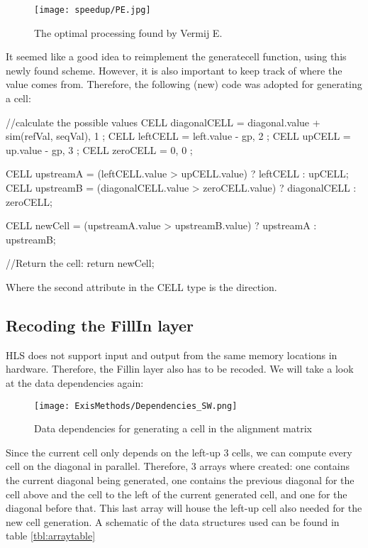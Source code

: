 \begin{figure}[H]
	\centering
	\texttt{[image: speedup/PE.jpg]}
	\caption{The optimal processing found by Vermij E.\cite{Vermij}}
	\label{fig:PE}
\end{figure}

It seemed like a good idea to reimplement the generatecell function, using this newly found scheme. However, it is also important to keep track of where the value comes from. Therefore, the following (new) code was adopted for generating a cell:

\begin{lcverbatim}
//calculate the possible  values
CELL diagonalCELL = { diagonal.value + sim(refVal, seqVal), 1 };
CELL leftCELL = { left.value - gp, 2 };
CELL upCELL = { up.value - gp, 3 };
CELL zeroCELL = { 0, 0 };

CELL upstreamA = (leftCELL.value > upCELL.value) ? leftCELL : upCELL;
CELL upstreamB = (diagonalCELL.value > zeroCELL.value) ? 
diagonalCELL : zeroCELL;

CELL newCell = (upstreamA.value > upstreamB.value) ? upstreamA : upstreamB;

//Return the cell:
return newCell;
\end{lcverbatim}
Where the second attribute in the CELL type is the direction.

\subsection{Recoding the FillIn layer}

HLS does not support input and output from the same memory locations in hardware. Therefore, the Fillin layer also has to be recoded. We will take a look at the data dependencies again:

\begin{figure}[H]
	\centering
	\texttt{[image: ExisMethods/Dependencies\_SW.png]}
	\caption{Data dependencies for generating a cell in the alignment matrix}
	\label{fig:DatDep2}
\end{figure}

Since the current cell only depends on the left-up 3 cells, we can compute every cell on the diagonal in parallel. Therefore, 3 arrays where created: one contains the current diagonal being generated, one contains the previous diagonal for the cell above and the cell to the left of the current generated cell, and one for the diagonal before that. This last array will house the left-up cell also needed for the new cell generation. A schematic of the data structures used can be found in table \ref{tbl:arraytable}

